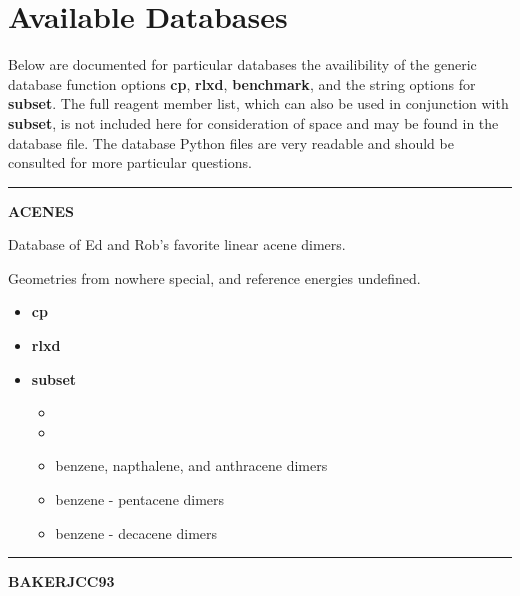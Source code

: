 \documentclass[letterpaper,10pt,english]{sphinxmanual}
\begin{document}
\chapter{Available Databases}
\label{db:available-databases}
Below are documented for particular databases the availibility of the generic
database function options \textbf{cp}, \textbf{rlxd}, \textbf{benchmark}, and the string
options for \textbf{subset}. The full reagent member list, which can also be used
in conjunction with \textbf{subset}, is not included here for consideration of space
and may be found in the database file. The database Python files are very
readable and should be consulted for more particular questions.


\bigskip\hrule{}\bigskip

\label{db:module-ACENES}
\textbf{ACENES}

\begin{DUlineblock}{0em}
\item[] Database of Ed and Rob's favorite linear acene dimers.
\item[] Geometries from nowhere special, and reference energies undefined.
\end{DUlineblock}
\begin{itemize}
\item {} 
\textbf{cp}   \textbar{}\textbar{} 

\item {} 
\textbf{rlxd} 

\item {} 
\textbf{subset}
\begin{itemize}
\item {} 

\item {} 

\item {} 
 benzene, napthalene, and anthracene dimers

\item {} 
 benzene - pentacene dimers

\item {} 
 benzene - decacene dimers

\end{itemize}

\end{itemize}


\bigskip\hrule{}\bigskip

\label{db:module-BAKERJCC93}
\textbf{BAKERJCC93}
\end{document}
